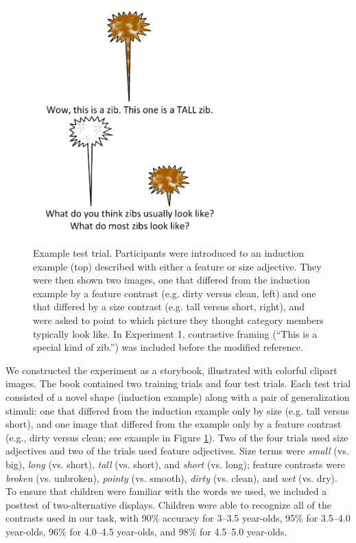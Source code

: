 \documentclass[man]{apa2}
\begin{document}
\begin{figure}[t]
  \begin{center} 
    \includegraphics[width=3in]{figures/zib_demo.png} 
    \caption{\label{fig:inanimate_demo} Example test trial. Participants were introduced to an induction example (top) described with either a feature or size adjective. They were then shown two images, one that differed from the induction example by a feature contrast (e.g. dirty versus clean, left) and one that differed by a size contrast (e.g. tall versus short, right), and were asked to point to which picture they thought category members typically look like. In Experiment 1, contrastive framing (``This is a special kind of zib.'') was included before the modified reference. } 
  \end{center} 
\vspace{-10ex}
\end{figure}	

We constructed the experiment as a storybook, illustrated with colorful clipart images. The book contained two training trials and four test trials. Each test trial consisted of a novel shape (induction example) along with a pair of generalization stimuli: one that differed from the induction example only by size (e.g. tall versus short), and one image that differed from the example only by a feature contrast (e.g., dirty versus clean; see example in Figure \ref{fig:inanimate_demo}). Two of the four trials used size adjectives and two of the trials used feature adjectives. Size terms were \emph{small} (vs. big), \emph{long} (vs. short), \emph{tall} (vs. short), and \emph{short} (vs. long);  feature contrasts were \emph{broken} (vs. unbroken), \emph{pointy} (vs. smooth), \emph{dirty} (vs. clean), and \emph{wet} (vs. dry).  To ensure that children were familiar with the words we used, we included a posttest of two-alternative displays.  Children were able to recognize all of the contrasts used in our task, with 90\% accuracy for 3--3.5 year-olds, 95\% for 3.5--4.0 year-olds, 96\% for 4.0--4.5 year-olds, and 98\% for 4.5--5.0 year-olds.  
\end{document}
